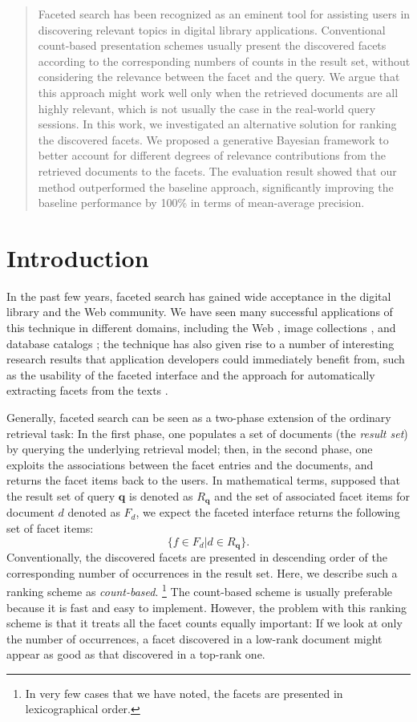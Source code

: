 \begin{abstract} Faceted search has been recognized as an eminent tool for
assisting users in discovering relevant topics in digital library applications.
Conventional count-based presentation schemes usually present the discovered
facets according to the corresponding numbers of counts in the result set,
without considering the relevance between the facet and the query.  We argue
that this approach might work well only when the retrieved documents are all
highly relevant, which is not usually the case in the real-world query
sessions.  In this work, we investigated an alternative solution for ranking
the discovered facets.  We proposed a generative Bayesian framework to better
account for different degrees of relevance contributions from the retrieved
documents to the facets.  The evaluation result showed that our
method outperformed the baseline approach, significantly improving the
baseline performance by 100\% in terms of mean-average precision.
\end{abstract}

\section{Introduction}

In the past few years, faceted search has gained wide acceptance in the digital
library and the Web community.  We have seen many successful applications of
this technique in different domains, including the Web
\cite{hearst2002finding}, image collections \cite{yee2003faceted}, and database
catalogs \cite{roy2008minimum}; the technique has also given rise to a number
of interesting research results that application developers could immediately
benefit from, such as the usability of the faceted interface
\cite{kules2009what} and the approach for automatically extracting facets from
the texts \cite{mimno2007organizing}.  

Generally, faceted search can be seen as a two-phase extension of the ordinary
retrieval task: In the first phase, one populates a set of documents (the
\emph{result set}) by querying the underlying retrieval model; then, in the
second phase, one exploits the associations between the facet entries and the
documents, and returns the facet items back to the users.  In mathematical
terms, supposed that the result set of query $\mathbf{q}$ is denoted as
$R_{\mathbf{q}}$ and the set of associated facet items for document $d$ denoted
as $F_d$, we expect the faceted interface returns the following set of facet
items: \[ \{ f \in F_d | d \in R_{\mathbf{q}} \}.  \] Conventionally, the
discovered facets are presented in descending order of the corresponding number
of occurrences in the result set.  Here, we describe such a ranking scheme as
\emph{count-based}.  \footnote{In very few cases that we have noted, the facets
are presented in lexicographical order.} The count-based scheme is usually
preferable because it is fast and easy to implement.  However, the problem with
this ranking scheme is that it treats all the facet counts equally important:
If we look at only the number of occurrences, a facet discovered in a low-rank
document might appear as good as that discovered in a top-rank one.  

